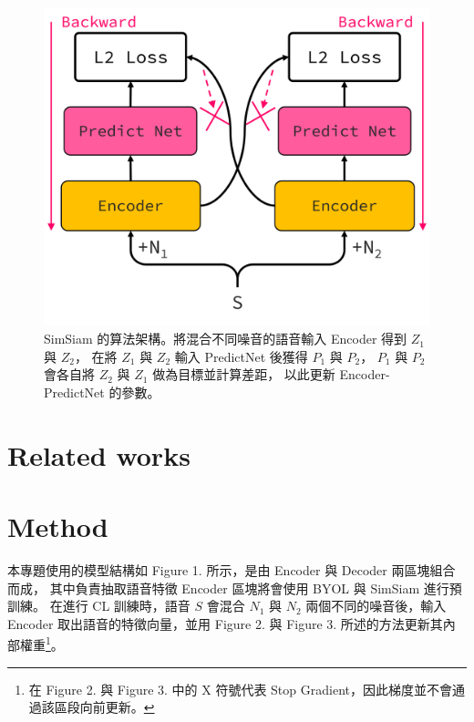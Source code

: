 \documentclass[10pt,twocolumn,letterpaper]{article}
\begin{document}
\begin{CJK}{UTF8}{bkai}
   \begin{figure}[t]
      \begin{center}
         \includegraphics[width=1\linewidth]{img/SimSiam.png}
      \end{center}
      \caption{
         SimSiam 的算法架構。將混合不同噪音的語音輸入 Encoder 得到 $Z_1$ 與 $Z_2$，
         在將 $Z_1$ 與 $Z_2$ 輸入 PredictNet 後獲得 $P_1$ 與 $P_2$，
         $P_1$ 與 $P_2$ 會各自將 $Z_2$ 與 $Z_1$ 做為目標並計算差距，
         以此更新 Encoder-PredictNet 的參數。
      }
      \label{fig:long}
      \label{fig:onecol}
   \end{figure}
   \section{Related works}
   \section{Method}
   本專題使用的模型結構如 Figure 1. 所示，是由 Encoder 與 Decoder 兩區塊組合而成，
   其中負責抽取語音特徵 Encoder 區塊將會使用 BYOL 與 SimSiam 進行預訓練。
   在進行 CL 訓練時，語音 $S$ 會混合 $N_1$ 與 $N_2$ 兩個不同的噪音後，輸入 Encoder
   取出語音的特徵向量，並用 Figure 2. 與 Figure 3. 所述的方法更新其內部權重\footnote{
      在 Figure 2. 與 Figure 3. 中的 X 符號代表 Stop Gradient，因此梯度並不會通過該區段向前更新。}。


\end{CJK}
\end{document}
